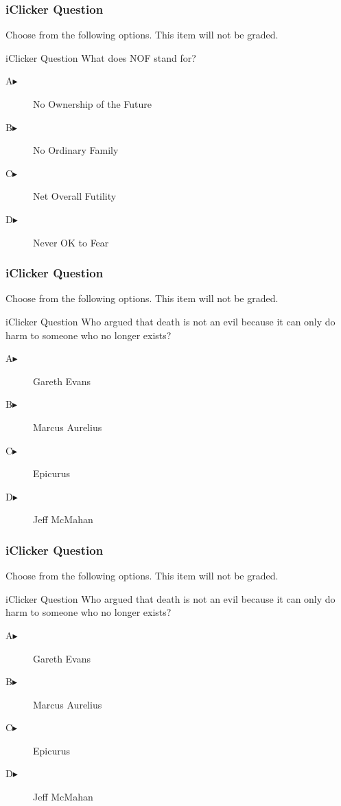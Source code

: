 \documentclass[xcolor=dvipsnames]{beamer}
\begin{document}
\begin{frame}
  \frametitle{iClicker Question}
Choose from the following options. This item will not be graded.
\begin{block}{iClicker Question}
What does NOF stand for?
\end{block}
\begin{description}
\item[A\hspace{.2in}$\blacktriangleright$] No Ownership of the Future
\item[B\hspace{.2in}$\blacktriangleright$] No Ordinary Family
\item[C\hspace{.2in}$\blacktriangleright$] Net Overall Futility
\item[D\hspace{.2in}$\blacktriangleright$] Never OK to Fear
\end{description}
\end{frame}

\begin{frame}
  \frametitle{iClicker Question}
Choose from the following options. This item will not be graded.
\begin{block}{iClicker Question}
Who argued that death is not an evil because it can only do harm to
someone who no longer exists?
\end{block}
\begin{description}
\item[A\hspace{.2in}$\blacktriangleright$] Gareth Evans
\item[B\hspace{.2in}$\blacktriangleright$] Marcus Aurelius
\item[C\hspace{.2in}$\blacktriangleright$] Epicurus
\item[D\hspace{.2in}$\blacktriangleright$] Jeff McMahan
\end{description}
\end{frame}

\begin{frame}
  \frametitle{iClicker Question}
Choose from the following options. This item will not be graded.
\begin{block}{iClicker Question}
Who argued that death is not an evil because it can only do harm to
someone who no longer exists?
\end{block}
\begin{description}
\item[A\hspace{.2in}$\blacktriangleright$] Gareth Evans
\item[B\hspace{.2in}$\blacktriangleright$] Marcus Aurelius
\item[C\hspace{.2in}$\blacktriangleright$] Epicurus
\item[D\hspace{.2in}$\blacktriangleright$] Jeff McMahan
\end{description}
\end{frame}
\end{document}
